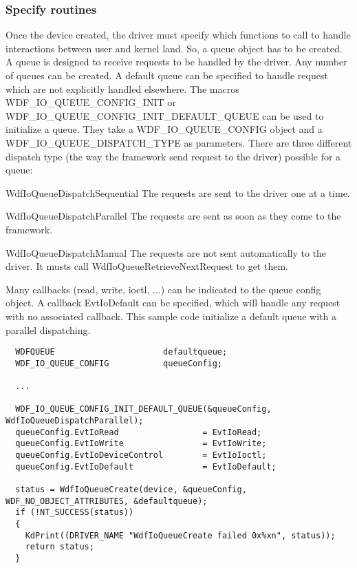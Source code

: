 \documentclass[11pt]{report}
\begin{document}
        \subsubsection{Specify routines}
Once the device created, the driver must specify which functions to call
to handle interactions between user and kernel land.
So, a queue object has to be created. A queue is designed to receive requests
to be handled by the driver. Any number of queues can be created.
A default queue can be specified to handle request which are not explicitly
handled elsewhere.
The macros
WDF\_IO\_QUEUE\_CONFIG\_INIT
or
WDF\_IO\_QUEUE\_CONFIG\_INIT\_DEFAULT\_QUEUE
can be used to initialize
a queue. They take a
WDF\_IO\_QUEUE\_CONFIG
object and
a
WDF\_IO\_QUEUE\_DISPATCH\_TYPE
as parameters.
There are three different dispatch type (the way the framework
send request to the driver) possible for a queue:
\begin{description}
  \item{WdfIoQueueDispatchSequential}
    The requests are sent to the driver one at a time.
  \item{WdfIoQueueDispatchParallel}
    The requests are sent as soon as they come to the framework.
  \item{WdfIoQueueDispatchManual}
    The requests are not sent automatically to the driver.
    It musts call WdfIoQueueRetrieveNextRequest to get them.
\end{description}
Many callbacks (read, write, ioctl, ...) can be indicated to the queue config object.
A callback EvtIoDefault can be specified, which will handle any request
with no associated callback.
This sample code initialize a default queue with a parallel dispatching.
\begin{lstlisting}
  WDFQUEUE                      defaultqueue;
  WDF_IO_QUEUE_CONFIG           queueConfig;

  ...

  WDF_IO_QUEUE_CONFIG_INIT_DEFAULT_QUEUE(&queueConfig, WdfIoQueueDispatchParallel);
  queueConfig.EvtIoRead                 = EvtIoRead;
  queueConfig.EvtIoWrite                = EvtIoWrite;
  queueConfig.EvtIoDeviceControl        = EvtIoIoctl;
  queueConfig.EvtIoDefault              = EvtIoDefault;

  status = WdfIoQueueCreate(device, &queueConfig, WDF_NO_OBJECT_ATTRIBUTES, &defaultqueue);
  if (!NT_SUCCESS(status))
  {
    KdPrint((DRIVER_NAME "WdfIoQueueCreate failed 0x%xn", status));
    return status;
  }
\end{lstlisting}
\end{document}
